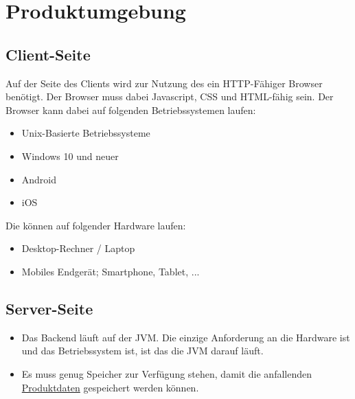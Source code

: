\section{Produktumgebung}


\subsection{Client-Seite}
Auf der Seite des Clients wird zur Nutzung des  ein HTTP-Fähiger Browser benötigt. Der Browser muss dabei Javascript, CSS und HTML-fähig sein. Der Browser kann dabei auf folgenden Betriebssystemen laufen:

\begin{itemize}
    \item Unix-Basierte Betriebssysteme
    \item Windows 10 und neuer
    \item Android
    \item iOS
\end{itemize}

Die  können auf folgender Hardware laufen:

\begin{itemize}
    \item Desktop-Rechner / Laptop 
    \item Mobiles Endgerät; Smartphone, Tablet, ...
\end{itemize}

    
\subsection{Server-Seite}
\begin{itemize}
    \item Das Backend läuft auf der JVM. Die einzige Anforderung an die Hardware ist und das \gls{Betriebssystem} ist, ist das die JVM darauf läuft.
    \item Es muss genug Speicher zur Verfügung stehen, damit die anfallenden \hyperref[PD]{Produktdaten} gespeichert werden können.
\end{itemize}